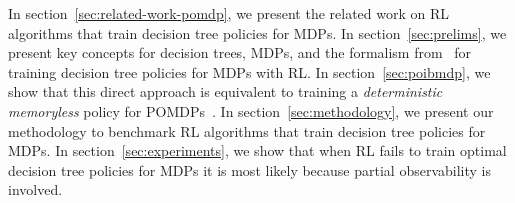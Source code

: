 In section~\ref{sec:related-work-pomdp}, we present the related work on RL algorithms that train decision tree policies for MDPs.
In section~\ref{sec:prelims}, we present key concepts for decision trees, MDPs, and the formalism from~\cite{topin2021iterative} for training decision tree policies for MDPs with RL.
In section~\ref{sec:poibmdp}, we show that this direct approach is equivalent to training a \emph{deterministic memoryless} policy for POMDPs~\citep{POMDP}.
In section~\ref{sec:methodology}, we present our methodology to benchmark RL algorithms that train decision tree policies for MDPs.
In section~\ref{sec:experiments}, we show that when RL fails to train optimal decision tree policies for MDPs it is most likely because partial observability is involved.
